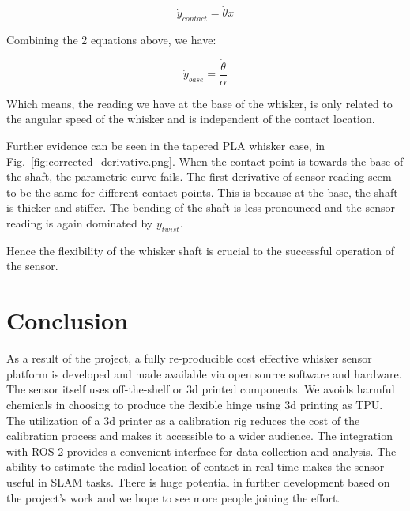 \documentclass{report}
\begin{document}
    \[\dot{y}_{contact} = \dot{\theta}x\]

Combining the 2 equations above, we have:

    \[\dot{y}_{base} = \frac{\dot{\theta}}{\alpha} \]

Which means, the reading we have at the base of the whisker, is only related to the angular speed of the whisker and is independent of the contact location.

Further evidence can be seen in the tapered PLA whisker case, in Fig.~\ref*{fig:corrected_derivative.png}. When the contact point is towards the base of the shaft, the parametric curve fails. The first derivative of sensor reading seem to be the same for different contact points. This is because at the base, the shaft is thicker and stiffer. The bending of the shaft is less pronounced and the sensor reading is again dominated by \({y}_{twist}\).

Hence the flexibility of the whisker shaft is crucial to the successful operation of the sensor.


\section{Conclusion}

As a result of the project, a fully re-producible cost effective whisker sensor platform is developed and made available via open source software and hardware. The sensor itself uses off-the-shelf or 3d printed components. We avoids harmful chemicals in choosing to produce the flexible hinge using 3d printing as TPU. The utilization of a 3d printer as a calibration rig reduces the cost of the calibration process and makes it accessible to a wider audience. The integration with ROS 2 provides a convenient interface for data collection and analysis. The ability to estimate the radial location of contact in real time makes the sensor useful in SLAM tasks. There is huge potential in further development based on the project's work and we hope to see more people joining the effort.


\printbibliography
\end{document}
